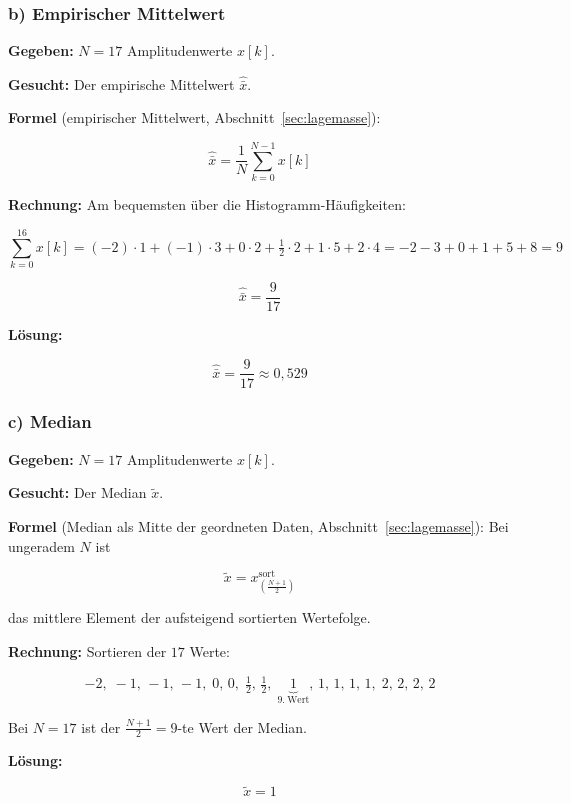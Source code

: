 \subsubsection*{b) Empirischer Mittelwert}

\begin{beispiel}

\textbf{Gegeben:} $N = 17$ Amplitudenwerte $x[k]$.

\textbf{Gesucht:} Der empirische Mittelwert $\hat{\bar{x}}$.

\textbf{Formel} (empirischer Mittelwert, Abschnitt~\ref{sec:lagemasse}):

$$
\hat{\bar{x}} = \frac{1}{N} \sum_{k=0}^{N-1} x[k]
$$

\textbf{Rechnung:} Am bequemsten über die Histogramm-Häufigkeiten:

$$
\sum_{k=0}^{16} x[k]
= (-2)\cdot 1 + (-1)\cdot 3 + 0\cdot 2 + \tfrac12\cdot 2 + 1\cdot 5 + 2\cdot 4
= -2 - 3 + 0 + 1 + 5 + 8 = 9
$$

$$
\hat{\bar{x}} = \frac{9}{17}
$$

\textbf{Lösung:}

$$
\boxed{\;\hat{\bar{x}} = \frac{9}{17} \approx 0{,}529\;}
$$

\end{beispiel}

\subsubsection*{c) Median}

\begin{beispiel}[Median]

\textbf{Gegeben:} $N = 17$ Amplitudenwerte $x[k]$.

\textbf{Gesucht:} Der Median $\tilde{x}$.

\textbf{Formel} (Median als Mitte der geordneten Daten,
Abschnitt~\ref{sec:lagemasse}): Bei ungeradem $N$ ist

$$
\tilde{x} = x_{\left(\frac{N+1}{2}\right)}^{\text{sort}}
$$

das mittlere Element der aufsteigend sortierten Wertefolge.

\textbf{Rechnung:} Sortieren der $17$ Werte:

$$
-2,\; -1,\, -1,\, -1,\; 0,\, 0,\; \tfrac12,\, \tfrac12,\;
\underbrace{1}_{9.\ \text{Wert}},\, 1,\, 1,\, 1,\, 1,\; 2,\, 2,\, 2,\, 2
$$

Bei $N = 17$ ist der $\tfrac{N+1}{2} = 9$-te Wert der Median.

\textbf{Lösung:}

$$
\boxed{\;\tilde{x} = 1\;}
$$

\end{beispiel}

